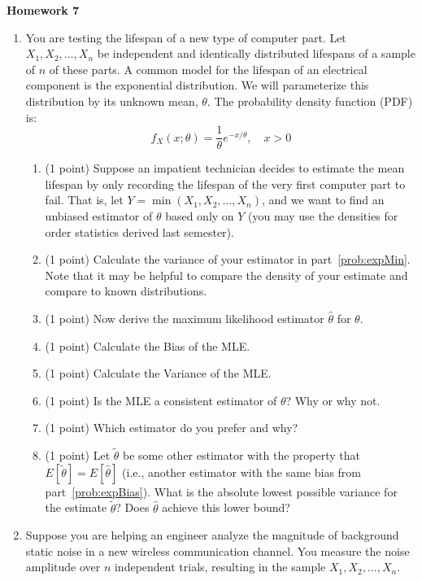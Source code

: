 \documentclass[10pt,twoside]{article}\usepackage[]{graphicx}\usepackage[dvipsnames,svgnames,table]{xcolor}
\begin{document}
\begin{flushright}
\begin{minipage}{.33\textwidth}
\rightline{\today}
\end{minipage}
\end{flushright}

\begin{center}
{\large{\textbf{Homework 7}}}
\end{center}

\begin{enumerate}
  \item You are testing the lifespan of a new type of computer part. Let $X_1, X_2, \ldots, X_n$ be independent and identically distributed lifespans of a sample of $n$ of these parts. A common model for the lifespan of an electrical component is the exponential distribution. We will parameterize this distribution by its unknown mean, $\theta$. The probability density function (PDF) is:
  $$f_X(x; \theta) = \frac{1}{\theta} e^{-x/\theta}, \quad x > 0$$
  \begin{enumerate}
    \item (1 point) \label{prob:expMin} Suppose an impatient technician decides to estimate the mean lifespan by only recording the lifespan of the very first computer part to fail. That is, let $Y = \min(X_1, X_2, \ldots, X_n)$, and we want to find an unbiased estimator of $\theta$ based only on $Y$ (you may use the densities for order statistics derived last semester).
    \item (1 point) Calculate the variance of your estimator in part~\ref{prob:expMin}.
    Note that it may be helpful to compare the density of your estimate and compare to known distributions.
    \item (1 point) Now derive the maximum likelihood estimator $\hat{\theta}$ for $\theta$.
    \item (1 point) \label{prob:expBias} Calculate the Bias of the MLE.
    \item (1 point) Calculate the Variance of the MLE.
    \item (1 point) Is the MLE a consistent estimator of $\theta$? Why or why not.
    \item (1 point) Which estimator do you prefer and why?
    \item (1 point) Let $\tilde{\theta}$ be some other estimator with the property that $E[\tilde{\theta}] = E[\hat{\theta}]$ (i.e., another estimator with the same bias from part~\ref{prob:expBias}). What is the absolute lowest possible variance for the estimate $\tilde{\theta}$? Does $\hat{\theta}$ achieve this lower bound?
  \end{enumerate}
  \item Suppose you are helping an engineer analyze the magnitude of background static noise in a new wireless communication channel. You measure the noise amplitude over $n$ independent trials, resulting in the sample $X_1, X_2, \ldots, X_n$.


\end{enumerate}
\end{document}
